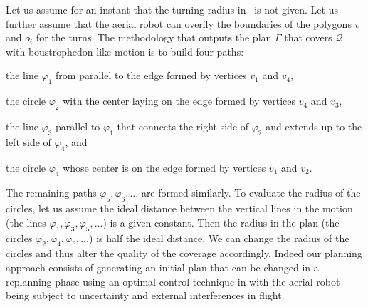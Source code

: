 Let us assume for an instant that the turning radius in~ is not given. Let us further assume that the aerial robot can overfly the boundaries of the polygons $v$ and $o_i$ for the turns. The methodology that outputs the plan $\Gamma$ that covers $\mathcal{Q}$ with boustrophedon-like motion is to build four paths:
\begin{enumerate*}[label={(\alph*)},font={\textit}]
  \item the line $\varphi_1$ from  parallel to the edge formed by vertices $v_1$ and $v_4$,
  \item the circle $\varphi_2$ with the center laying on the edge formed by vertices $v_4$ and $v_3$,
  \item the line $\varphi_3$ parallel to $\varphi_1$ that connects the right side of $\varphi_2$ and extends up to the left side of $\varphi_4$, and
  \item the circle $\varphi_4$ whose center is on the edge formed by vertices $v_1$ and $v_2$.
\end{enumerate*}
The remaining paths $\varphi_5,\varphi_6,\dots$ are formed similarly. To evaluate the radius of the circles, let us assume the ideal distance between the vertical lines in the motion (the lines $\varphi_1,\varphi_3,\varphi_5,\dots$) is a given constant. Then the radius in the plan (the circles $\varphi_2,\varphi_4,\varphi_6,\dots$) is half the ideal distance. We can change the radius of the circles and thus alter the quality of the coverage accordingly. Indeed our planning approach consists of generating an initial plan that can be changed in a replanning phase using an optimal control technique in  with the aerial robot being subject to uncertainty and external interferences in flight.

